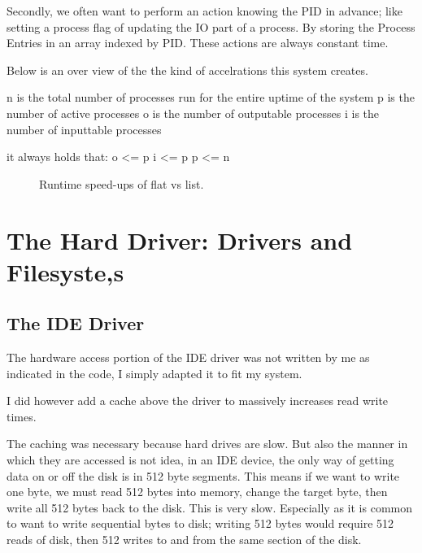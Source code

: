\documentclass[a4paper]{report}
\begin{document}
Secondly, we often want to perform an action knowing the PID in advance; like setting a process flag of updating the IO part of a process. By storing the Process Entries in an array indexed by PID. These actions are always constant time.

Below is an over view of the the kind of accelrations this system creates.

n is the total number of processes run for the entire uptime of the system
p is the number of active processes
o is the number of outputable processes
i is the number of inputtable processes

it always holds that:
o <= p
i <= p
p <= n

\begin{figure}[ht]
  \centering

  \def\svgwidth{\columnwidth}
  \caption{Runtime speed-ups of flat vs list.}
  \label{fig:schedulerscreen}
\end{figure}


















\section{The Hard Driver: Drivers and Filesyste,s}

\subsection{The IDE Driver}

The hardware access portion of the IDE driver was not written by me as indicated in the code, I simply adapted it to fit my system.

I did however add a cache above the driver to massively increases read write times.

The caching was necessary because hard drives are slow. But also the manner in which they are accessed is not idea, in an IDE device, the only way of getting data on or off the disk is in 512 byte segments. This means if we want to write one byte, we must read 512 bytes into memory, change the target byte, then write all 512 bytes back to the disk. This is very slow. Especially as it is common to want to write sequential bytes to disk; writing 512 bytes would require 512 reads of disk, then 512 writes to and from the same section of the disk.
\end{document}
